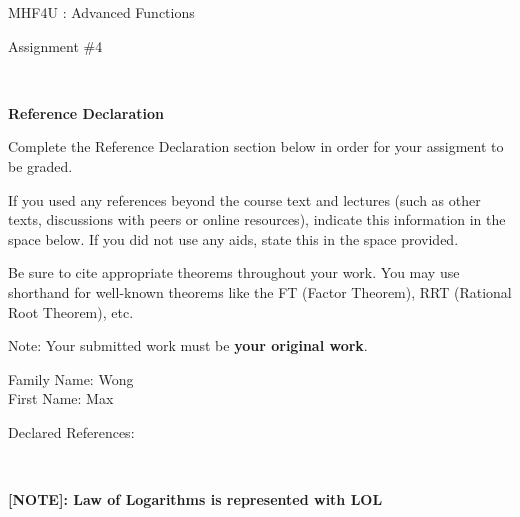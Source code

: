 \documentclass[12pt]{book}
\begin{document}
\vspace{-1.0in}\begin{center}
\Large{MHF4U :  Advanced Functions }

\Large{Assignment \#4}


\end{center}


\vspace{0.015in}\hrulefill\ 

\textbf{Reference Declaration} %

Complete the Reference Declaration section below in order for your assigment to be graded.

If you used any references beyond the course text and lectures (such as other texts, discussions with peers or online resources), indicate this information in the space below.  If you did not use any aids, state this in the space provided. 

Be sure to cite appropriate theorems throughout your work. You may use shorthand for well-known theorems like the FT (Factor Theorem), RRT (Rational Root Theorem), etc. 

Note: Your submitted work must be \textbf{your original work}. 

Family Name: Wong\\%
First Name: Max%

Declared References: 


\vspace{0.015in}\hrulefill\ 

\vspace{0.5cm}
\textbf{[NOTE]: Law of Logarithms is represented with LOL}

\newpage

\end{document}
